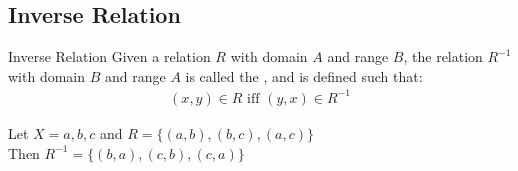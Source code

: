 \documentclass[../notes.tex]{subfiles}
\begin{document}
			\subsection{Inverse Relation}
				\begin{definition}{Inverse Relation}
					Given a relation $R$ with domain $A$ and range $B$, the relation $R^{-1}$ with domain $B$ and range $A$ is called the , and is defined such that:
					\begin{align*}
						(x, y) \in R \text{ iff } (y, x) \in R^{-1}
					\end{align*}
				\end{definition}
				\begin{example}[width=0.6\textwidth]
					Let $X = {a, b, c}$ and $R = \bigl\{(a, b), (b, c), (a, c)\bigr\}$\\
					Then $R^{-1} = \bigl\{(b, a), (c, b), (c, a)\bigr\}$
				\end{example}
\end{document}
